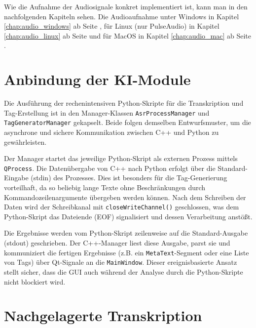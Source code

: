 Wie die Aufnahme der Audiosignale konkret implementiert ist, kann man in den nachfolgenden Kapiteln sehen. Die Audioaufnahme unter Windows in Kapitel \ref{chap:audio_windows} ab Seite \pageref{chap:audio_windows}, für Linux (nur PulseAudio) in Kapitel \ref{chap:audio_linux} ab Seite \pageref{chap:audio_linux} und für MacOS in Kapitel \ref{chap:audio_mac} ab Seite \pageref{chap:audio_mac}.



\section{Anbindung der KI-Module}
\label{sec:ki_anbindung}

Die Ausführung der rechenintensiven Python-Skripte für die Transkription und Tag-Erstellung ist in den Manager-Klassen \texttt{AsrProcessManager} und \texttt{TagGeneratorManager} gekapselt. Beide folgen demselben Entwurfsmuster, um die asynchrone und sichere Kommunikation zwischen C++ und Python zu gewährleisten.

Der Manager startet das jeweilige Python-Skript als externen Prozess mittels \texttt{QProcess}. Die Datenübergabe von C++ nach Python erfolgt über die Standard-Eingabe (stdin) des Prozesses. Dies ist besonders für die Tag-Generierung vorteilhaft, da so beliebig lange Texte ohne Beschränkungen durch Kommandozeilenargumente übergeben werden können. Nach dem Schreiben der Daten wird der Schreibkanal mit \texttt{closeWriteChannel()} geschlossen, was dem Python-Skript das Dateiende (EOF) signalisiert und dessen Verarbeitung anstößt.

Die Ergebnisse werden vom Python-Skript zeilenweise auf die Standard-Ausgabe (stdout) geschrieben. Der C++-Manager liest diese Ausgabe, parst sie und kommuniziert die fertigen Ergebnisse (z.B. ein \texttt{MetaText}-Segment oder eine Liste von Tags) über Qt-Signale an die \texttt{MainWindow}. Dieser ereignisbasierte Ansatz stellt sicher, dass die GUI auch während der Analyse durch die Python-Skripte nicht blockiert wird.


\section{Nachgelagerte Transkription}
\label{sec:whisper}

